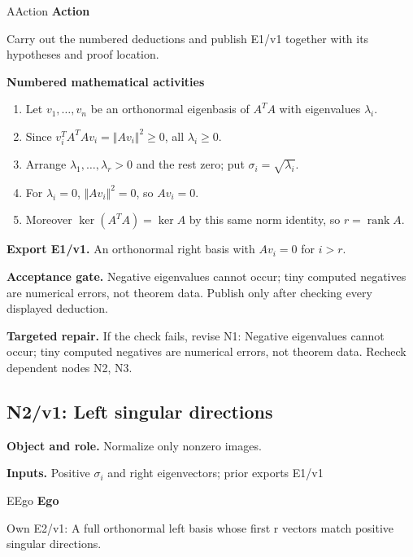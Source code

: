 \documentclass[preprint,12pt,aps,pra,showkeys,amsmath,amssymb,superscriptaddress,floatfix]{revtex4-2}
\theoremstyle{definition}
\theoremstyle{remark}
\newcommand{\mmfaculty}[3]{%
 \begin{mmfacultybox}{#1}{#2}
 {\sffamily\bfseries\color{MMBlue}#2}\par\smallskip #3
 \end{mmfacultybox}}
\newcommand{\field}[2]{\par\smallskip\noindent\textbf{#1.} #2\par}
\begin{document}
\mmfaculty{A}{Action}{Carry out the numbered deductions and publish E1/v1 together with its
hypotheses and proof location.}

\smallskip\noindent\textbf{Numbered mathematical activities}

\begin{enumerate}[label=N1.\arabic*,leftmargin=3.4em]

\item Let \(v_{1},\ldots ,v_n\) be an orthonormal eigenbasis of \(A^{T}A\)
with eigenvalues \(\lambda _i\).

\item Since \(v_i^{T}A^{T}Av_i=\Vert Av_i\Vert ^{2}\ge 0\), all
\(\lambda _i\ge 0\).

\item Arrange \(\lambda _{1},\ldots ,\lambda _r>0\) and the rest zero; put
\(\sigma _i=\sqrt{\lambda _i}\).

\item For \(\lambda _i=0\), \(\Vert Av_i\Vert ^{2}=0\), so \(Av_i=0\).

\item Moreover \(\operatorname{ker} (A^{T}A)=\operatorname{ker} A\) by this
same norm identity, so \(r=\operatorname{rank} A\).

\end{enumerate}

\field{Export E1/v1}{An orthonormal right basis with \(Av_i=0\) for \(i>r\).}

\field{Acceptance gate}{Negative eigenvalues cannot occur; tiny computed negatives are numerical
errors, not theorem data. Publish only after checking every displayed
deduction.}

\field{Targeted repair}{If the check fails, revise N1: Negative eigenvalues cannot occur; tiny
computed negatives are numerical errors, not theorem data. Recheck
dependent nodes N2, N3.}

\clearpage

\subsection{N2/v1: Left singular directions}

\field{Object and role}{Normalize only nonzero images.}

\field{Inputs}{Positive \(\sigma _i\) and right eigenvectors; prior exports E1/v1}

\mmfaculty{E}{Ego}{Own E2/v1: A full orthonormal left basis whose first r vectors match
positive singular directions.}
\end{document}
